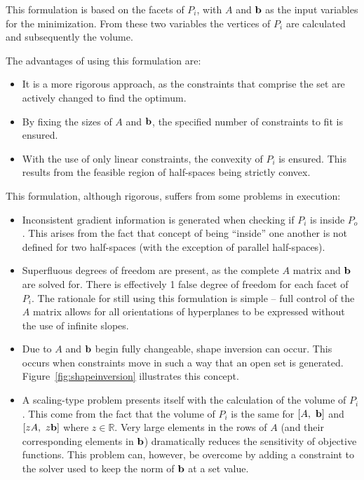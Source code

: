 This formulation is based on the facets of $P_i$, with $A$ and ${\bf {b}}$ as the input variables for the minimization.
From these two variables the vertices of $P_i$ are calculated and subsequently the volume.

The advantages of using this formulation are:
\begin{itemize}
\item It is a more rigorous approach, as the constraints that comprise the set are actively changed to find the optimum.
\item By fixing the sizes of $A$ and ${\bf {b}}$, the specified number of constraints to fit is ensured.
\item With the use of only linear constraints, the convexity of $P_i$ is ensured.
This results from the feasible region of half-spaces being strictly convex.
\end{itemize}

This formulation, although rigorous, suffers from some problems in execution:
\begin{itemize}
\item Inconsistent gradient information is generated when checking if $P_i$ is inside $P_o$.
This arises from the fact that concept of being ``inside'' one another is not defined for two half-spaces (with the exception of parallel half-spaces).
\item Superfluous degrees of freedom are present, as the complete $A$ matrix and ${\bf {b}}$ are solved for.
There is effectively 1 false degree of freedom for each facet of $P_i$.
The rationale for still using this formulation is simple -- full control of the $A$ matrix allows for all orientations of hyperplanes to be expressed without the use of infinite slopes.
\item Due to $A$ and ${\bf {b}}$ begin fully changeable, shape inversion can occur.
This occurs when constraints move in such a way that an open set is generated.
Figure~\ref{fig:shapeinversion} illustrates this concept.
\item A scaling-type problem presents itself with the calculation of the volume of $P_i$.
This come from the fact that the volume of $P_i$ is the same for $[A,~ {\bf {b}}]$ and $[zA,~z{\bf {b}}]$ where $z\in \mathbb{R}$.
Very large elements in the rows of $A$ (and their corresponding elements in ${\bf {b}}$) dramatically reduces the sensitivity of objective functions.
This problem can, however, be overcome by adding a constraint to the solver used to keep the norm of ${\bf {b}}$ at a set value.
\end{itemize}

